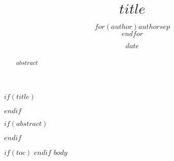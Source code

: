 \documentclass[$if(fontsize)$$fontsize$,$endif$$if(lang)$$babel-lang$,$endif$$if(papersize)$$papersize$paper,$endif$$if(beamer)$ignorenonframetext,$if(handout)$handout,$endif$$if(aspectratio)$aspectratio=$aspectratio$,$endif$$endif$$for(classoption)$$classoption$$sep$,$endfor$]{$documentclass$}
\title{\color{HTWGreenDark}$title$}
\author{$for(author)$$author$$sep$\\$endfor$}
\date{$date$}
\begin{document}
 $if(title)$
  \maketitle
 $endif$

 $if(abstract)$
 \begin{abstract}
  $abstract$
 \end{abstract}
 $endif$

 $if(toc)$
  \tableofcontents
 $endif$
 $body$
\end{document}
